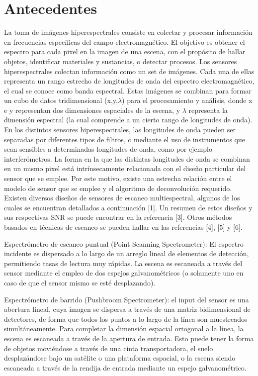\documentclass{ctuthesis}
\begin{document}
\section*{Antecedentes}
La toma de imágenes hiperespectrales consiste en colectar y procesar información en frecuencias específicas del campo electromagnético. El objetivo es obtener el espectro para cada pixel en la imagen de una escena, con el propósito de hallar objetos, identificar materiales y sustancias, o detectar procesos.
Los sensores hiperespectrales colectan información como un  set de imágenes. Cada una de ellas representa un rango estrecho de longitudes de onda del espectro electromagnético, el cual se conoce como banda espectral. Estas imágenes se combinan para formar un cubo de datos tridimensional (x,y,$\lambda$) para el procesamiento y análisis, donde x e y representan dos dimensiones espaciales de la escena, y $\lambda$ representa la dimensión espectral (la cual comprende a un cierto rango de longitudes de onda).
En los distintos sensores hiperespectrales, las longitudes de onda pueden ser separadas por diferentes tipos de filtros, o mediante el uso de instrumentos que sean sensibles a determinadas longitudes de onda, como por ejemplo interferómetros. La forma en la que las distintas longitudes de onda se combinan en un mismo pixel está intrínsecamente relacionada con el diseño particular del sensor que se emplee. Por este motivo, existe una estrecha relación entre el modelo de sensor que se emplee y el algoritmo de deconvolución requerido. Existen diversos diseños de sensores de escaneo multiespectral, algunos de los cuales se encuentran detallados a continuación [1]. Un resumen de estos diseños y sus respectivas SNR se puede encontrar en la referencia [3]. Otros métodos basados en técnicas de escaneo se pueden hallar en las referencias [4], [5] y  [6]. 

Espectrómetro de escaneo puntual (Point Scanning Spectrometer): El espectro incidente es dispersado a lo largo de un arreglo lineal de elementos de detección, permitiendo tasas de lectura muy rápidas. La escena es escaneada  a través del sensor mediante el empleo de dos espejos galvanométricos (o solamente uno en caso de que el sensor mismo se esté desplazando).

Espectrómetro de barrido (Pushbroom Spectrometer): el input del sensor es una abertura lineal, cuya imagen se dispersa a través de una matriz bidimensional de detectores, de forma que todos los puntos a lo largo de la línea son muestreados simultáneamente. Para completar la dimensión espacial ortogonal a la línea, la escena es escaneada a través de la apertura de entrada. Esto puede tener la forma de objetos moviéndose a través de una cinta transportadora, el suelo desplazándose bajo un satélite o una plataforma espacial, o la escena siendo escaneada a través de la rendija de entrada mediante un espejo galvanométrico.
\end{document}
